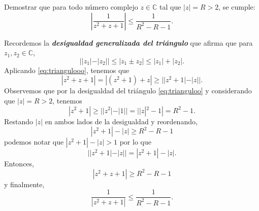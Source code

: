 \documentclass[twoside]{book}
\def\C{\mathbb{C}}
\renewcommand{\emph}[1]{\textbf{\textit{\textcolor{amber}{#1}}}}
\begin{document}
\begin{example}{}
    Demostrar que para todo n\'umero complejo $z\in \mathbb C$ tal que  $|z|=R>2$, se cumple:
    \[
        \left|\frac{1}{z^{2}+z+1}\right|\leq\frac{1}{R^{2}-R-1}.
    \]
\end{example}
\begin{sol}
    \begin{solucion}{}
        Recordemos la \emph{desigualdad generalizada del tri\'angulo} que afirma que para $z_1,z_2\in\C$,
        \begin{equation}\label{eq:triangulooo}
            ||z_1|-|z_2||\leq|z_1\pm z_2|\leq|z_1|+|z_2|.
        \end{equation}
        Aplicando \eqref{eq:triangulooo}, tenemos que
        $$|z^2+z+1|=|(z^2+1)+z|\geq||z^2+1|-|z||.$$
        Observemos que por la desigualdad del tri\'angulo \eqref{eq:trianguloo} y considerando que $|z|=R>2$, tenemos
        $$|z^2+1|\geq||z^2|-|1||=||z|^2-1|=R^2-1.$$
        Restando $|z|$ en ambos lados de la desigualdad y reordenando,
        $$|z^2+1|-|z|\geq R^2-R-1$$
        podemos notar que $|z^2+1|-|z|>1$
        por lo que
        $$||z^2+1|-|z||=|z^2+1|-|z|.$$
        Entonces,
        $$|z^2+z+1|\geq R^2-R-1$$
        y finalmente,
        $$
            \frac{1}{|z^2+z+1|}\leq\frac{1}{ R^2-R-1}.
        $$
    \end{solucion}
\end{sol}
\end{document}
